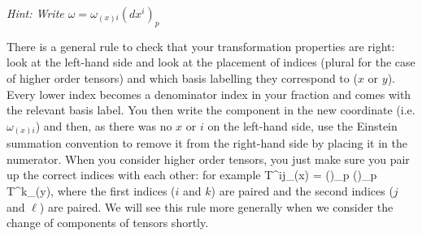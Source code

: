     \textit{Hint: Write $\omega = \omega_{(x)i}(dx^i)_p$}
\ebox 

There is a general rule to check that your transformation properties are right: look at the left-hand side and look at the placement of indices (plural for the case of higher order tensors) and which basis labelling they correspond to ($x$ or $y$). Every lower index becomes a denominator index in your fraction and comes with the relevant basis label. You then write the component in the new coordinate (i.e. $\omega_{(x)i}$) and then, as there was no $x$ or $i$ on the left-hand side, use the Einstein summation convention to remove it from the right-hand side by placing it in the numerator. When you consider higher order tensors, you just make sure you pair up the correct indices with each other: for example 
\bse 
    T^{ij}_{(x)} = \bigg(\bigg)_p \bigg(\bigg)_p T^{k\ell}_{(y)},
\ese 
where the first indices ($i$ and $k$) are paired and the second indices ($j$ and $\ell$) are paired. We will see this rule more generally when we consider the change of components of tensors shortly. 